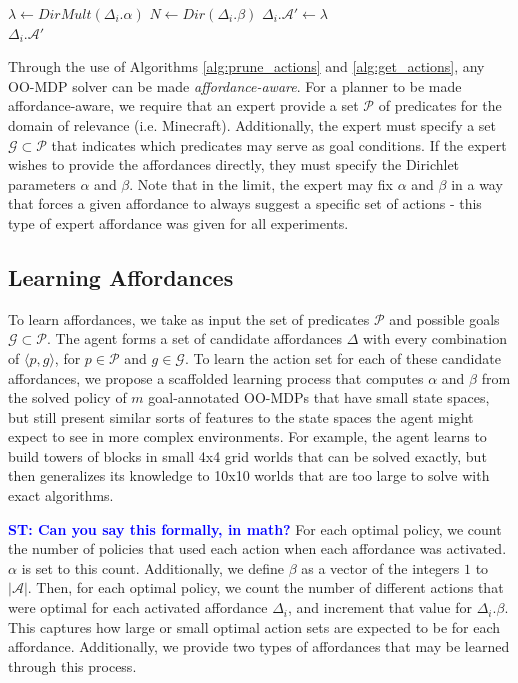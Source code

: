\documentclass[conference]{IEEEtran}
\newcommand{\stnote}[1]{\textcolor{Blue}{\textbf{ST: #1}}}
\begin{document}
\begin{algorithm}
  \caption{$\Delta_i.getActions(s)$}
  \begin{algorithmic}[1]
    \State $\lambda \leftarrow DirMult(\Delta_i.\alpha)$
    \State $N \leftarrow Dir(\Delta_i.\beta)$
    \State $\Delta_i.\mathcal{A}' \leftarrow \lambda$
    \EndFor \\
    \Return $\Delta_i.\mathcal{A}'$
  \end{algorithmic}
  \label{alg:get_actions}
\end{algorithm}

Through the use of Algorithms \ref{alg:prune_actions} and \ref{alg:get_actions}, any OO-MDP solver can be made
{\it affordance-aware}. For a planner to be made affordance-aware, we require that an expert provide a set $\mathcal{P}$ of predicates
for the domain of relevance (i.e. Minecraft). Additionally, the expert must specify a set
$\mathcal{G} \subset \mathcal{P}$ that indicates which predicates may serve as goal conditions. If the expert wishes
to provide the affordances directly, they must specify the Dirichlet parameters $\alpha$ and $\beta$. Note that
in the limit, the expert may fix $\alpha$ and $\beta$ in a way that forces a given
affordance to always suggest a specific set of actions - this type of expert affordance was given for all
experiments.

\subsection{Learning Affordances}

To learn affordances, we take as input the set of predicates
$\mathcal{P}$ and possible goals $\mathcal{G} \subset \mathcal{P}$.
The agent forms a set of candidate affordances $\Delta$ with every
combination of $\langle p, g \rangle$, for $p \in \mathcal{P}$ and $g
\in \mathcal{G}$.  To learn the action set for each of these candidate
affordances, we propose a scaffolded learning process that computes
$\alpha$ and $\beta$ from the solved policy of $m$ goal-annotated
OO-MDPs that have small state spaces, but still present similar sorts
of features to the state spaces the agent might expect to see in more
complex environments.  For example, the agent learns to build towers
of blocks in small 4x4 grid worlds that can be solved exactly, but
then generalizes its knowledge to 10x10 worlds that are too large to
solve with exact algorithms.

\stnote{Can you say this formally, in math?}
For each optimal policy, we count the number of policies that used
each action when each affordance was activated. $\alpha$ is set to
this count. Additionally, we define $\beta$ as a vector of the
integers $1$ to $|\mathcal{A}|$.  Then, for each optimal policy, we
count the number of different actions that were optimal for each
activated affordance $\Delta_i$, and increment that value for
$\Delta_i.\beta$. This captures how large or small optimal action sets
are expected to be for each affordance. Additionally, we provide two
types of affordances that may be learned through this process.
\end{document}

